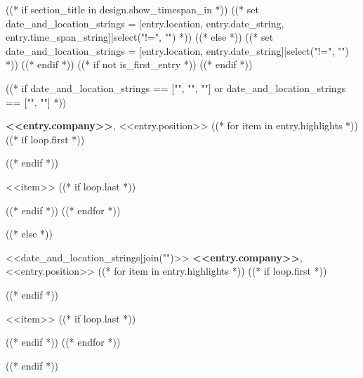 ((* if section_title in design.show_timespan_in *))
    ((* set date_and_location_strings = [entry.location, entry.date_string, entry.time_span_string]|select("!=", "") *))
((* else *))
    ((* set date_and_location_strings = [entry.location, entry.date_string]|select("!=", "") *))
((* endif *))
((* if not is_first_entry *))
\vspace{<<design.margins.entry_area.vertical_between>>}
((* endif *))

((* if date_and_location_strings == ["", "", ""] or date_and_location_strings == ["", ""] *))
\begin{onecolentry}
    \textbf{<<entry.company>>}, <<entry.position>>
((* for item in entry.highlights *))
    ((* if loop.first *))
    \begin{highlights}
    ((* endif *))
        \item <<item>>
    ((* if loop.last *))
    \end{highlights}
    ((* endif *))
((* endfor *))
\end{onecolentry}
((* else *))
\begin{twocolentry}{
    <<date_and_location_strings|join("\n\n")>>
}
    \textbf{<<entry.company>>}, <<entry.position>>
((* for item in entry.highlights *))
    ((* if loop.first *))
    \begin{highlights}
    ((* endif *))
        \item <<item>>
    ((* if loop.last *))
    \end{highlights}
    ((* endif *))
((* endfor *))
\end{twocolentry}
((* endif *))